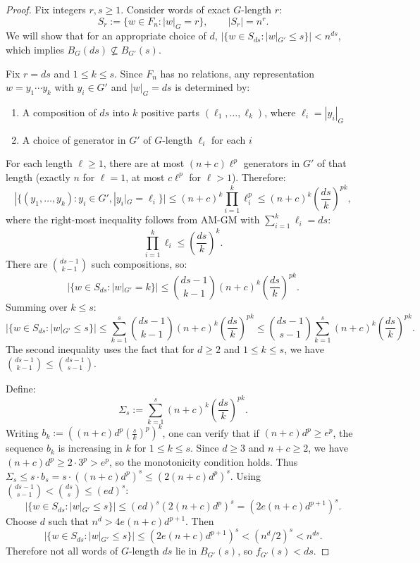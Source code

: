 \documentclass[12pt]{amsart}
\theoremstyle{definition}
\theoremstyle{remark}
\begin{document}
\begin{proof}
Fix integers $r, s \geq 1$. Consider words of exact $G$-length $r$:
\[
S_r := \{w \in F_n : |w|_G = r\}, \qquad |S_r| = n^r.
\]
We will show that for an appropriate choice of $d$, $|\{w \in S_{ds} : |w|_{G'} \leq s\}| < n^{ds}$, which implies $B_G(ds) \not\subseteq B_{G'}(s)$.

Fix $r = ds$ and $1 \leq k \leq s$.
Since $F_n$ has no relations, any representation $w = y_1 \cdots y_k$ with $y_i \in G'$ and $|w|_G = ds$ is determined by:
\begin{enumerate}
\item A composition of $ds$ into $k$ positive parts $(\ell_1, \ldots, \ell_k)$, where $\ell_i = |y_i|_G$
\item A choice of generator in $G'$ of $G$-length $\ell_i$ for each $i$
\end{enumerate}
For each length $\ell \geq 1$, there are at most $(n+c)\ell^p$ generators in $G'$ of that length (exactly $n$ for $\ell = 1$, at most $c\ell^p$ for $\ell > 1$).
Therefore:
\[
|\{(y_1, \ldots, y_k) : y_i \in G', |y_i|_G = \ell_i\}| \leq (n+c)^k \prod_{i=1}^k \ell_i^p \leq (n+c)^k \left(\frac{ds}{k}\right)^{pk},
\]
where the right-most inequality follows from AM-GM with $\sum_{i=1}^k \ell_i = ds$:
\[
\prod_{i=1}^k \ell_i \leq \left(\frac{ds}{k}\right)^k.
\]
There are $\binom{ds-1}{k-1}$ such compositions, so:
\[
|\{w \in S_{ds} : |w|_{G'} = k\}| \leq \binom{ds-1}{k-1} (n+c)^k \left(\frac{ds}{k}\right)^{pk}.
\]
Summing over $k \leq s$:
\[
|\{w \in S_{ds} : |w|_{G'} \leq s\}| \leq \sum_{k=1}^s \binom{ds-1}{k-1} (n+c)^k \left(\frac{ds}{k}\right)^{pk} \leq \binom{ds-1}{s-1} \sum_{k=1}^s (n+c)^k \left(\frac{ds}{k}\right)^{pk}.
\]
The second inequality uses the fact that for $d \geq 2$ and $1 \leq k \leq s$, we have $\binom{ds-1}{k-1} \leq \binom{ds-1}{s-1}$. 

Define:
\[
\Sigma_s := \sum_{k=1}^s (n+c)^k \left(\frac{ds}{k}\right)^{pk}.
\]
Writing $b_k := \left((n+c)d^p \left(\frac{s}{k}\right)^p\right)^k$, one can verify that if $(n+c)d^p \geq e^p$, the sequence $b_k$ is increasing in $k$ for $1 \leq k \leq s$.
Since $d \geq 3$ and $n + c \geq 2$, we have $(n+c)d^p \geq 2 \cdot 3^p > e^p$, so the monotonicity condition holds.
Thus $\Sigma_s \leq s \cdot b_s = s \cdot ((n+c)d^p)^s \leq (2(n+c)d^p)^s$.
Using $\binom{ds-1}{s-1} < \binom{ds}{s} \leq (ed)^s$:
\[
|\{w \in S_{ds} : |w|_{G'} \leq s\}| \leq (ed)^s (2(n+c)d^p)^s = (2e(n+c)d^{p+1})^s.
\]
Choose $d$ such that $n^d > 4e(n+c) d^{p+1}$.
Then
\[
|\{w \in S_{ds} : |w|_{G'} \leq s\}| \leq (2e(n+c) d^{p+1})^s < (n^d/2)^s < n^{ds}.
\]
Therefore not all words of $G$-length $ds$ lie in $B_{G'}(s)$, so $f_{G'}(s) < ds$.
\end{proof}
\end{document}
